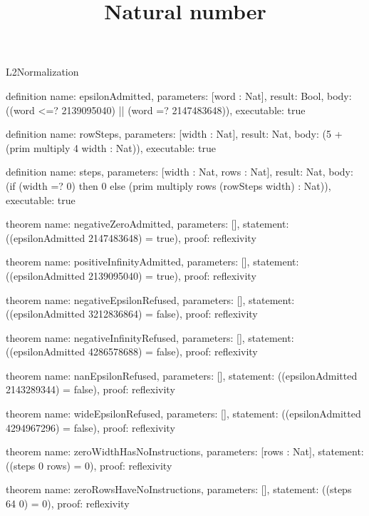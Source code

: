 \begin{lexlean}{L2Normalization}
\title{Natural number}
\begin{semanticmodule}
definition{
  name: epsilonAdmitted,
  parameters: [word : Nat],
  result: Bool,
  body: ((word <=? 2139095040) || (word =? 2147483648)),
  executable: true
}

definition{
  name: rowSteps,
  parameters: [width : Nat],
  result: Nat,
  body: (5 + (prim multiply 4 width : Nat)),
  executable: true
}

definition{
  name: steps,
  parameters: [width : Nat, rows : Nat],
  result: Nat,
  body: (if (width =? 0) then 0 else (prim multiply rows (rowSteps width) : Nat)),
  executable: true
}

theorem{
  name: negativeZeroAdmitted,
  parameters: [],
  statement: ((epsilonAdmitted 2147483648) = true),
  proof: reflexivity{}
}

theorem{
  name: positiveInfinityAdmitted,
  parameters: [],
  statement: ((epsilonAdmitted 2139095040) = true),
  proof: reflexivity{}
}

theorem{
  name: negativeEpsilonRefused,
  parameters: [],
  statement: ((epsilonAdmitted 3212836864) = false),
  proof: reflexivity{}
}

theorem{
  name: negativeInfinityRefused,
  parameters: [],
  statement: ((epsilonAdmitted 4286578688) = false),
  proof: reflexivity{}
}

theorem{
  name: nanEpsilonRefused,
  parameters: [],
  statement: ((epsilonAdmitted 2143289344) = false),
  proof: reflexivity{}
}

theorem{
  name: wideEpsilonRefused,
  parameters: [],
  statement: ((epsilonAdmitted 4294967296) = false),
  proof: reflexivity{}
}

theorem{
  name: zeroWidthHasNoInstructions,
  parameters: [rows : Nat],
  statement: ((steps 0 rows) = 0),
  proof: reflexivity{}
}

theorem{
  name: zeroRowsHaveNoInstructions,
  parameters: [],
  statement: ((steps 64 0) = 0),
  proof: reflexivity{}
}
\end{semanticmodule}
\end{lexlean}
